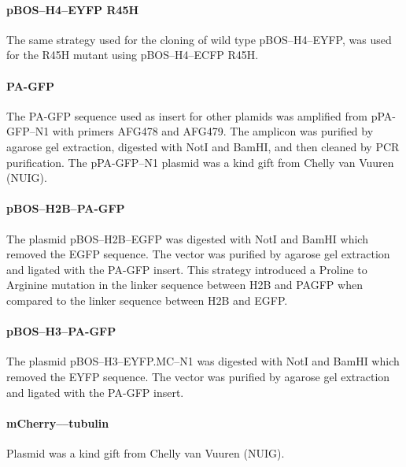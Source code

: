      \paragraph{pBOS--H4--EYFP R45H}
      The same strategy used for the cloning of wild type
      pBOS--H4--EYFP, was used for the R45H mutant using
      pBOS--H4--ECFP R45H.

      \paragraph{PA-GFP}
      The PA-GFP sequence used as insert for other plamids was
      amplified from pPA-GFP--N1 with primers AFG478 and AFG479.  The
      amplicon was purified by agarose gel extraction, digested with
      NotI and BamHI, and then cleaned by PCR purification.  The
      pPA-GFP--N1 plasmid was a kind gift from Chelly van Vuuren
      (NUIG).

      \paragraph{pBOS--H2B--PA-GFP}
      The plasmid pBOS--H2B--EGFP was digested with NotI and BamHI
      which removed the EGFP sequence.  The vector was purified by
      agarose gel extraction and ligated with the PA-GFP insert.  This
      strategy introduced a Proline to Arginine mutation in the linker
      sequence between H2B and PAGFP when compared to the linker
      sequence between H2B and EGFP.

      \paragraph{pBOS--H3--PA-GFP}
      The plasmid pBOS--H3--EYFP.MC--N1 was digested with NotI and
      BamHI which removed the EYFP sequence.  The vector was purified
      by agarose gel extraction and ligated with the PA-GFP insert.

      \paragraph{mCherry--\textalpha--tubulin}
      Plasmid was a kind gift from Chelly van Vuuren (NUIG).

